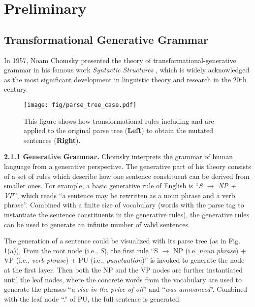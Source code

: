 \section{Preliminary}
\subsection{Transformational Generative Grammar}
In 1957, Noam Chomsky presented the theory of transformational-generative grammar in his famous work \textit{Syntactic Structures} \cite{chomsky2002syntactic}, which is widely acknowledged as the most significant development in linguistic theory and research in the 20th century.

\begin{figure}[h]
\centering
     \centering
    \texttt{[image: fig/parse\_tree\_case.pdf]}
        \caption{This figure shows how transformational rules including  and  are applied to the original parse tree (\textbf{Left}) to obtain the mutated sentences (\textbf{Right}).}
        \label{fig:intro:parser_tree}
\end{figure}


\noindent\textbf{2.1.1 Generative Grammar.} Chomsky interprets the grammar of human language from a generative perspective. The generative part of his theory consists of a set of rules which describe how one sentence constituent can be derived from smaller ones. For example, a basic generative rule of English is ``\textit{S $\to$ NP + VP}'', which reads ``a sentence may be rewritten as a noun phrase and a verb phrase''. Combined with a finite size of vocabulary (words with the parse tag to instantiate the sentence constituents in the generative rules), the generative rules can be used to generate an infinite number of valid sentences. 


The generation of a sentence could be visualized with its parse tree (as in Fig. \ref{fig:intro:parser_tree}(a)), From the root node (i.e., \textit{S}), the first rule ``S $\to$ NP (i.e. \textit{noun phrase}) + VP (i.e., \textit{verb phrase}) + PU (i.e., \textit{punctuation})'' is invoked to generate the node at the first layer. Then both the NP and the VP nodes are further instantiated until the leaf nodes, where the concrete words from the vocabulary are used to generate the phrases ``\textit{a rise in the price of oil}'' and ``\textit{was announced}''. Combined with the leaf node ``.'' of PU, the full sentence is generated. 


